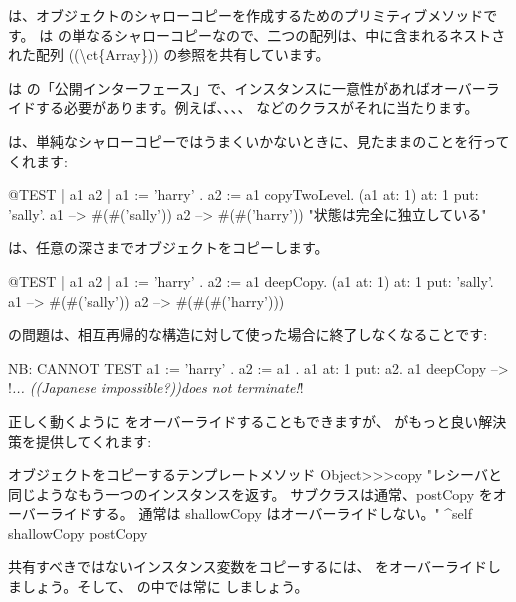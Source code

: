 \documentclass[a4paper,10pt,twoside]{book}
\begin{document}
 は、オブジェクトのシャローコピーを作成するためのプリミティブメソッドです。 は  の単なるシャローコピーなので、二つの配列は、中に含まれるネストされた配列 ((\textbackslash ct\{Array\})) の参照を共有しています。

 は  の「公開インターフェース」で、インスタンスに一意性があればオーバーライドする必要があります。例えば、、、、 などのクラスがそれに当たります。

 は、単純なシャローコピーではうまくいかないときに、見たままのことを行ってくれます:

\begin{code}{@TEST | a1 a2 |}
a1 := { { 'harry' } } .
a2 := a1 copyTwoLevel.
(a1 at: 1) at: 1 put: 'sally'.
a1 --> #(#('sally'))
a2 --> #(#('harry'))    "状態は完全に独立している"
\end{code}

 は、任意の深さまでオブジェクトをコピーします。

\begin{code}{@TEST | a1 a2 |}
a1 := { { { 'harry' } } } .
a2 := a1 deepCopy.
(a1 at: 1) at: 1 put: 'sally'.
a1 --> #(#('sally'))
a2 --> #(#(#('harry')))
\end{code}

 の問題は、相互再帰的な構造に対して使った場合に終了しなくなることです:

\begin{code}{NB: CANNOT TEST}
a1 := { 'harry' }.
a2 := { a1 }.
a1 at: 1 put: a2.
a1 deepCopy --> !\emph{... ((Japanese impossible?))does not terminate!}!
\end{code}

正しく動くように  をオーバーライドすることもできますが、 がもっと良い解決策を提供してくれます:

\begin{method}{オブジェクトをコピーするテンプレートメソッド}
Object>>>copy
    "レシーバと同じようなもう一つのインスタンスを返す。
    サブクラスは通常、postCopy をオーバーライドする。
    通常は shallowCopy はオーバーライドしない。"
    ^self shallowCopy postCopy
\end{method}

共有すべきではないインスタンス変数をコピーするには、 をオーバーライドしましょう。そして、 の中では常に  しましょう。
\end{document}
